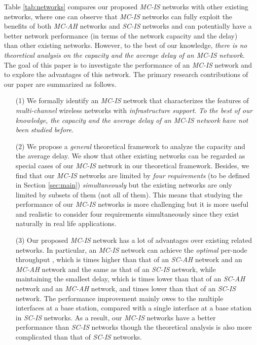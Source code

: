 \documentclass[10pt,journal]{IEEEtran}
\begin{document}
Table \ref{tab:networks} compares our proposed \textit{MC-IS} networks with other existing networks, where one can observe that \textit{MC-IS} networks can fully exploit the benefits of both \textit{MC-AH} networks and \textit{SC-IS} networks and can potentially have a better network performance (in terms of the network capacity and the delay) than other existing networks. However, to the best of our knowledge, \textit{there is no theoretical analysis on the capacity and the average delay of an \textit{MC-IS} network}. The goal of this paper is to investigate the performance of an \textit{MC-IS} network and to explore the advantages of this network. The primary research contributions of our paper are summarized as follows.
\begin{enumerate}
	\item[(1)] We formally identify an \textit{MC-IS} network that characterizes the features of \textit{multi-channel} wireless networks with \textit{infrastructure support}. {\it To the best of our knowledge, the capacity and the average delay of an \textit{MC-IS} network have not been studied before}.
	\item[(2)] We propose a \textit{general} theoretical framework to analyze the capacity and the average delay. We show that other existing networks can be regarded as special cases of our \textit{MC-IS} network in our theoretical framework. Besides, we find that our \emph{MC-IS} networks are limited by \emph{four requirements} (to be defined in Section \ref{sec:main}) \emph{simultaneously} but the existing networks are only limited by subsets of them (not all of them). This means that studying the performance of our \textit{MC-IS} networks is more challenging but it is more useful and realistic to consider four requirements simultaneously since they exist naturally in real life applications. 
\item[(3)] Our proposed \textit{MC-IS} network has a lot of advantages over existing related networks. In particular, an \textit{MC-IS} network can achieve the \textit{optimal} per-node throughput , which is  times higher than that of an \textit{SC-AH} network and an \textit{MC-AH} network and the same as that of an \textit{SC-IS} network, while maintaining the smallest delay, which is  times lower than that of an \textit{SC-AH} network and an \textit{MC-AH} network, and  times lower than that of an \textit{SC-IS} network. The performance improvement mainly owes to the multiple interfaces at a base station, compared with a single interface at a base station in \textit{SC-IS} networks. As a result, our \textit{MC-IS} networks have a better performance than \textit{SC-IS} networks though the theoretical analysis is also more complicated than that of \textit{SC-IS} networks.

\end{enumerate}
\end{document}

